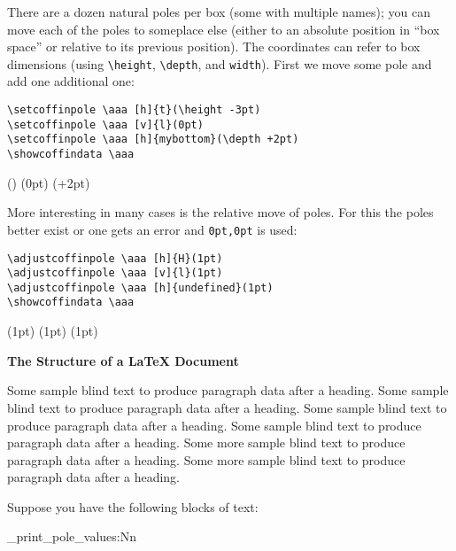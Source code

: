 \documentclass{article}
\newcommand\cbox[2][.8]{{\setlength\fboxsep{0pt}\colorbox[gray]{#1}{#2}}}
\begin{document}
There are a dozen natural poles per box (some with multiple names); you can
move each of the poles to someplace else (either to an absolute position in
``box space'' or relative to its previous position).  The coordinates can
refer to box dimensions (using \verb|\height|, \verb|\depth|,
 and \verb|width|). First we move some pole and add one
additional one:
\begin{verbatim}
\setcoffinpole \aaa [h]{t}(\height -3pt)
\setcoffinpole \aaa [v]{l}(0pt)
\setcoffinpole \aaa [h]{mybottom}(\depth +2pt)
\showcoffindata \aaa
\end{verbatim}
\setcoffinpole {}(\height -3pt)
\setcoffinpole {}(0pt)
\setcoffinpole {}(\depth +2pt)
\showcoffindata \aaa


More interesting in many cases is the relative move of poles. For this the
poles better exist or one gets an error and \texttt{0pt,0pt} is used:
\begin{verbatim}
\adjustcoffinpole \aaa [h]{H}(1pt)
\adjustcoffinpole \aaa [v]{l}(1pt)
\adjustcoffinpole \aaa [h]{undefined}(1pt)
\showcoffindata \aaa
\end{verbatim}
\adjustcoffinpole {}(1pt)
\adjustcoffinpole {}(1pt)
\adjustcoffinpole {}(1pt)
\showcoffindata \aaa



\sbox {}

\setvcoffin \bbb {11cm}
   {\raggedleft\normalfont\fontsize{36}{38pt}\bfseries
    The Structure of a \LaTeX{} Document}

\setvcoffin \ccc {13cm}
   {Some sample blind text to produce paragraph data after a heading.
    Some sample blind text to produce paragraph data after a heading.
    Some sample blind text to produce paragraph data after a heading.
    Some sample blind text to produce paragraph data after a heading.
    \endgraf
    Some more sample blind text to produce paragraph data after a heading.
    Some more sample blind text to produce paragraph data after a heading.
}


Suppose you have the following blocks of text:

\bigskip

\noindent\cbox{\usebox\aaa}

\begin{multicols}{2}
\ttfamily\tiny
\ExplSyntaxOn
   \noindent \coffin_print_pole_values:Nn \aaa \\
\ExplSyntaxOff
\end{multicols}
\end{document}
